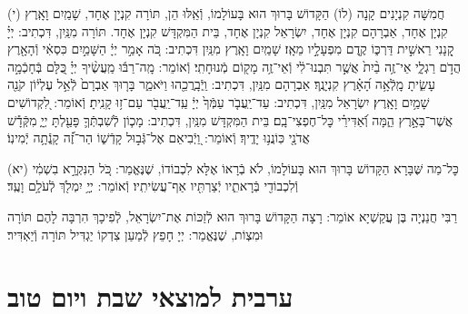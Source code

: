 \documentclass[twoside, openany, parskip=half, 11pt]{book}
\begin{document}
\vspace{0.5\baselineskip}

(י)
חֲמִשָּׁה קִנְיָנִים קָנָה (לוֹ) הַקָּדוֹשׁ בָּרוּךְ הוּא בָּעוֹלָמוֹ, וְֿאֵֽלּוּ הֵן, תּוֹרָה קִנְיָן אֶחָד, שָׁמַֽיִם וָאָֽרֶץ קִנְיָן אֶחָד, אַבְרָהָם קִנְיָן אֶחָד, יִשְׂרָאֵל קִנְיָן אֶחָד, בֵּית הַמִּקְדָּשׁ קִנְיָן אֶחָד. תּוֹרָה מִנַּֽיִן, דִּכְתִיב: יְיָ֗ קָ֭נָנִי רֵאשִׁ֣ית דַּרְכּ֑וֹ קֶ֖דֶם מִפְעָלָ֣יו מֵאָֽז׃ שָׁמַֽיִם וָאָֽרֶץ מִנַּֽיִן דִּכְתִיב: כֹּ֚ה אָמַ֣ר יְיָ֔ הַשָּׁמַ֣יִם כִּסְאִ֔י וְֿהָאָ֖רֶץ הֲדֹ֣ם רַגְלָ֑י אֵי־זֶ֥ה בַ֨יִת֙ אֲשֶׁ֣ר תִּבְנוּ־לִ֔י וְֿאֵי־זֶ֥ה מָק֖וֹם מְֿנוּחָתִֽי׃ וְֿאוֹמֵר: מָֽה־רַבּ֬וּ מַֽעֲשֶׂ֨יךָ יְיָ֗ כֻּ֭לָּם בְּֿחָכְֿמָ֣ה עָשִׂ֑יתָ מָֽלְֿאָ֥ה הָ֝אָ֗רֶץ קִנְיָנֶֽךָ׃ אַבְרָהָם מִנַּֽיִן, דִּכְתִיב: וַֽיְֿבָֽרֲכֵ֖הוּ וַיֹּאמַ֑ר בָּר֤וּךְ אַבְרָם֙ לְֿאֵ֣ל עֶלְי֔וֹן קֹנֵ֖ה שָׁמַ֥יִם וָאָֽרֶץ׃ יִשְׂרָאֵל מִנַּֽיִן, דִּכְתִיב: עַד־יַֽעֲבֹ֤ר עַמְּֿךָ֙ יְיָ֔ עַֽד־יַֽעֲבֹ֖ר עַם־ז֥וּ קָנִֽיתָ׃ וְֿאוֹמֵר: לִ֭קְדוֹשִׁים אֲשֶׁר־בָּאָ֣רֶץ הֵ֑מָּה וְֿ֝אַדִּירֵ֗י כׇּל־חֶפְצִי־בָֽם׃ בֵּית הַמִּקְדָּשׁ מִנַּֽיִן, דִּכְתִיב: מָכ֧וֹן לְֿשִׁבְתְּֿךָ֛ פָּעַ֖לְתָּ יְיָ֑ מִקְּֿדָ֕שׁ אֲדֹנָ֖י כּֽוֹנֲנ֥וּ יָדֶֽיךָ׃ וְֿאוֹמֵר: וַ֭יְֿבִיאֵם אֶל־גְּֿב֣וּל קָדְֿשׁ֑וֹ הַר־זֶ֝֗ה קָֽנְֿתָ֥ה יְֿמִינֽוֹ׃

(יא)
כׇּל־מַה שֶּׁבָּרָא הַקָּדוֹשׁ בָּרוּךְ הוּא בָּעוֹלָמוֹ, לֹא בְֿרָאוֹ אֶלָּא לִכְבוֹדוֹ, שֶׁנֶּאֱמַר: כֹּ֚ל הַנִּקְרָ֣א בִשְׁמִ֔י וְֿלִכְבוֹדִ֖י בְּֿרָאתִ֑יו יְֿצַרְתִּ֖יו אַף־עֲשִׂיתִֽיו׃ וְֿאוֹמֵר: יְיָ֥ יִמְלֹ֖ךְ לְֿעֹלָ֥ם וָעֶֽד׃



רַבִּי חֲנַנְיָה בֶּן עֲקַשְׁיָא אוֹמֵר:
רָצָה הַקָּדוֹשׁ בָּרוּךְ הוּא לְֿזַכּוֹת אֶת־יִשְׂרָאֵל, לְֿפִיכָךְ הִרְבָּה לָהֶם תּוֹרָה וּמִצְוֹת,
שֶׁנֶּאֱמַר: יְיָ חָפֵץ לְֿמַעַן צִדְקוֹ יַגְדִּיל תּוֹרָה וְֿיַאְדִּיר׃


\mournerskaddish




\vfill
{}\quad{}\quad{}





\chapter[ערבית למוצאי שבת ויום טוב]{ ערבית למוצאי שבת ויום טוב }
\end{document}
